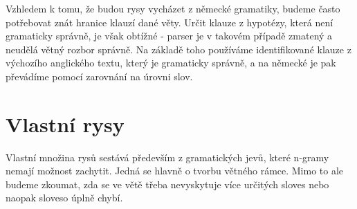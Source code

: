 \documentclass[12pt,a4paper]{report}
\begin{document}
Vzhledem k tomu, že budou rysy vycházet z německé gramatiky, budeme často potřebovat znát hranice klauzí dané věty. Určit klauze z hypotézy, která není gramaticky správně, je však obtížné - parser je v takovém případě zmatený a neudělá větný rozbor správně. Na základě toho používáme identifikované klauze z výchozího anglického textu, který je gramaticky správně, a na německé je pak převádíme pomocí zarovnání na úrovni slov. 

\section{Vlastní rysy}
Vlastní množina rysů sestává především z gramatických jevů, které n-gramy nemají možnost zachytit. Jedná se hlavně o tvorbu větného rámce. Mimo to ale budeme zkoumat, zda se ve větě třeba nevyskytuje více určitých sloves nebo naopak sloveso úplně chybí.
\end{document}
